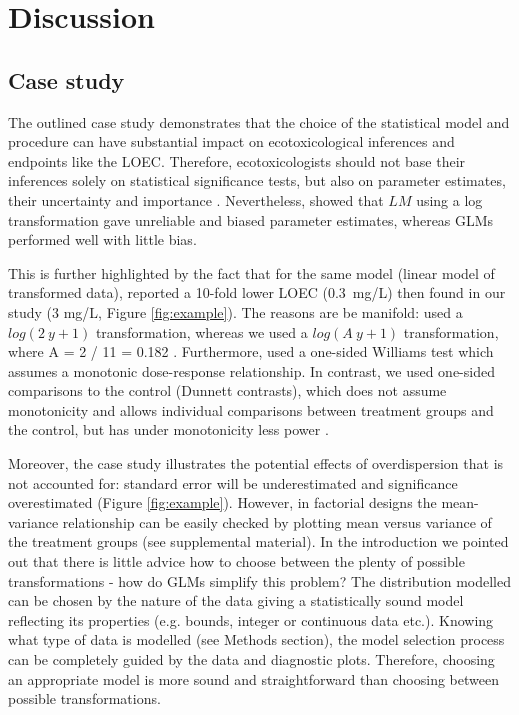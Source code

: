 \documentclass[twocolumn, natbib]{svjour3}
\begin{document}
\section{Discussion}
\label{sec:disc}
\subsection{Case study}
The outlined case study demonstrates that the choice of the statistical model and procedure can have substantial impact on ecotoxicological inferences and endpoints like the LOEC.
Therefore, ecotoxicologists should not base their inferences solely on statistical significance tests, but also on parameter estimates, their uncertainty and importance \citep{gelman_difference_2006}.
Nevertheless, \citet{ohara_not_2010} showed that $LM$ using a log transformation gave unreliable and biased parameter estimates, whereas GLMs performed well with little bias.

This is further highlighted by the fact that for the same model (linear model of transformed data), \citet{brock_minimum_2015} reported a 10-fold lower LOEC (\mbox{0.3 mg/L}) then found in our study (3 mg/L, Figure \ref{fig:example}).
The reasons are be manifold: \citep{brock_minimum_2015} used a $log(2~y + 1)$ transformation, whereas we used a $log(A~y + 1)$ transformation, where A = 2 / 11 = 0.182 \citep{van_den_brink_impact_2000}.
Furthermore, \citet{brock_minimum_2015} used a one-sided Williams test which assumes a monotonic dose-response relationship.
In contrast, we used one-sided comparisons to the control (Dunnett contrasts), which does not assume monotonicity and allows individual comparisons between treatment groups and the control, but has under monotonicity less power \citep{jaki_statistical_2013}.


Moreover, the case study illustrates the potential effects of overdispersion that is not accounted for: standard error will be underestimated and significance overestimated (Figure \ref{fig:example}).
However, in factorial designs the mean-variance relationship can be easily checked by plotting mean versus variance of the treatment groups (see supplemental material).
In the introduction we pointed out that there is little advice how to choose between the plenty of possible transformations - how do GLMs simplify this problem?
The distribution modelled can be chosen by the nature of the data giving a statistically sound model reflecting its properties (e.g. bounds, integer or continuous data etc.).
Knowing what type of data is modelled (see Methods section), the model selection process can be completely guided by the data and diagnostic plots. Therefore, choosing an appropriate model is more sound and straightforward than choosing between possible transformations.
\end{document}
